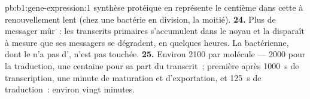 \begin{solution}{pb:b1:gene-expression:1}
synthèse protéique en représente le centième dans cette  à
renouvellement lent (chez une bactérie en division, la moitié).
\textbf{24.} Plus de messager mûr~: les transcrits primaires
s'accumulent dans le noyau et la  disparaît à mesure que ses
messagers se dégradent, en quelques heures. La  bactérienne,
dont le  n'a pas d', n'est pas touchée.
\textbf{25.} Environ 2100  par molécule --- 2000 pour la traduction,
une centaine pour sa part du transcrit~; première  après
\qty{1000}{s} de transcription, une minute de maturation et
d'exportation, et \qty{125}{s} de traduction~: environ vingt minutes.
\end{solution}
